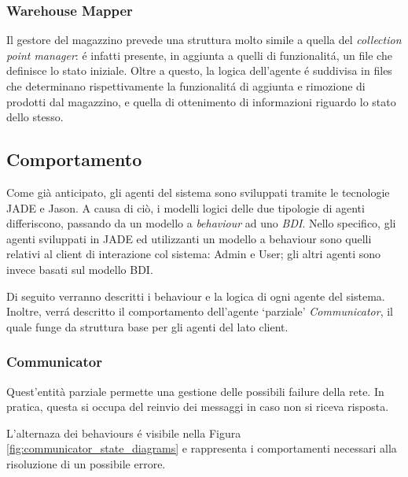 \subsubsection{Warehouse Mapper}
Il gestore del magazzino prevede una struttura molto simile a quella del \textit{collection point manager}: \'e infatti presente, in aggiunta a quelli di funzionalit\'a, un file che definisce lo stato iniziale. Oltre a questo, la logica dell'agente \'e suddivisa in files che determinano rispettivamente la funzionalit\'a di aggiunta e rimozione di prodotti dal magazzino, e quella di ottenimento di informazioni riguardo lo stato dello stesso.

\subsection{Comportamento}
% 

Come già anticipato, gli agenti del sistema sono sviluppati tramite le tecnologie JADE e Jason. A causa di ciò, i modelli logici delle due tipologie di agenti differiscono, passando da un modello a \textit{behaviour} ad uno \textit{BDI}. Nello specifico, gli agenti sviluppati in JADE ed utilizzanti un modello a behaviour sono quelli relativi al client di interazione col sistema: Admin e User; gli altri agenti sono invece basati sul modello BDI.

Di seguito verranno descritti i behaviour e la logica di ogni agente del sistema. Inoltre, verr\'a descritto il comportamento dell'agente `parziale' \textit{Communicator}, il quale funge da struttura base per gli agenti del lato client.

\subsubsection{Communicator}
Quest'entità parziale permette una gestione delle possibili failure della rete. In pratica, questa si occupa del reinvio dei messaggi in caso non si riceva risposta.

L'alternaza dei behaviours \'e visibile nella Figura \ref{fig:communicator_state_diagrams} e rappresenta i comportamenti necessari alla risoluzione di un possibile errore.

